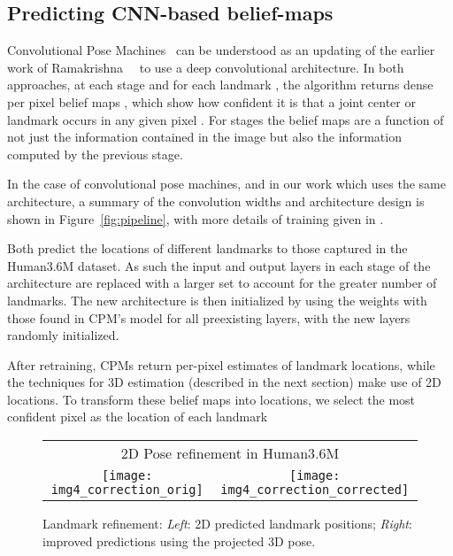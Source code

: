 \documentclass[10pt,twocolumn,letterpaper]{article}
\begin{document}
\subsection{Predicting CNN-based belief-maps}
\label{sec:CNN-belief-maps}
Convolutional Pose Machines~\cite{wei2016convolutional} can be
understood as an updating of the earlier work of
Ramakrishna~\etal~\cite{ramakrishna2014pose} to use a deep
convolutional architecture. In both approaches, at each stage  and
for each landmark , the algorithm returns dense per pixel belief
maps , which show how confident it is that a
joint center or landmark occurs in any given pixel .
For stages  the belief maps are a function of
not just the information contained in the image but also the
information computed by the previous stage.

In the case of convolutional pose machines, and in our work which uses
the same architecture, a summary of the convolution widths and
architecture design is shown in Figure~\ref{fig:pipeline}, with
more details of training given in \cite{wei2016convolutional}.

Both \cite{ramakrishna2014pose,wei2016convolutional} predict the locations of
different landmarks to those captured in the Human3.6M dataset. As such the
input and output layers in each stage of the architecture are replaced with a
larger set to account for the greater number of landmarks. The new architecture
is then initialized by using the weights with those found in CPM's model for all
preexisting layers, with the new layers randomly initialized.

After retraining, CPMs return per-pixel estimates of landmark locations, while
the techniques for 3D estimation (described in the next section) make use of 2D
locations. To transform these belief maps into locations, we select the most
confident pixel as the location of each landmark



\begin{figure}\vspace{-11mm}
\begin{center}
      \vspace{1.2cm}
\begin{tabular}{cc}
\multicolumn{2}{c}{2D Pose refinement in Human3.6M}\\
\texttt{[image: img4\_correction\_orig]}  & 
\texttt{[image: img4\_correction\_corrected]}  \\
\end{tabular}
\end{center}
\vspace{-5mm}
  \caption{\small Landmark refinement:    \textit{Left}: 2D predicted landmark
    positions; \textit{Right}: improved predictions using the projected 3D
    pose.\label{fig:manifold_2D_correction}
}
\end{figure}
\end{document}

